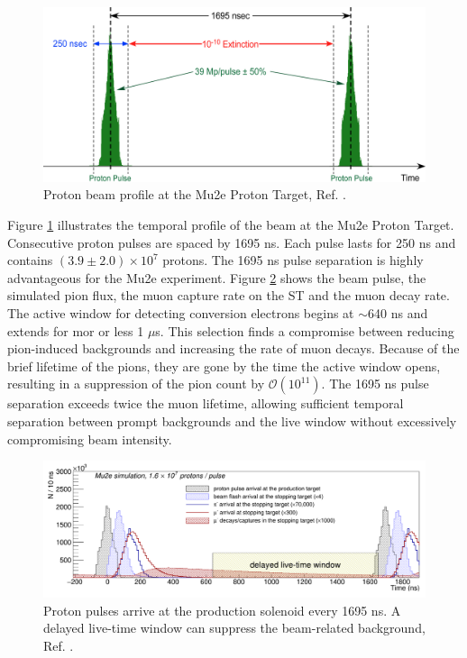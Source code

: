\begin{figure}[!h]
\centering
\includegraphics[width =\textwidth]{figures/png/Screenshot_20240301_151148.png}
\caption{Proton beam profile at the Mu2e Proton Target, Ref. \cite{accelerator}.}
\label{fig:beamprofile}
\end{figure}
Figure \ref{fig:beamprofile} illustrates the temporal profile of the beam at the Mu2e Proton Target. Consecutive proton pulses are spaced by 1695 ns. Each pulse lasts for 250 ns and contains $(3.9 \pm 2.0 )\times 10^7$ protons. The 1695 ns pulse separation is highly advantageous for the Mu2e experiment. Figure \ref{fig:beamwindow} shows the beam pulse, 
the simulated pion flux, the muon capture rate on the ST and the muon decay rate. The active window for detecting conversion electrons begins at $\sim$640 ns and extends for mor or less 1 $\mu$s. This selection finds a compromise between reducing pion-induced backgrounds  and increasing the rate of muon decays. Because of the brief lifetime of the pions, they are gone by the time the active window opens, resulting in a suppression of the pion count by $\mathcal{O}(10^{11})$. The 1695 ns pulse separation exceeds twice the muon lifetime, allowing sufficient temporal separation between prompt backgrounds and the live window without excessively compromising beam intensity.
\begin{figure}[!h]
\centering
\includegraphics[width =\textwidth]{figures/png/Screenshot_20240301_164649.png}
\caption{Proton pulses arrive at the production solenoid every 1695 ns. A delayed live-time window can suppress the beam-related background, Ref. \cite{universe9010054}.}
\label{fig:beamwindow}
\end{figure}
